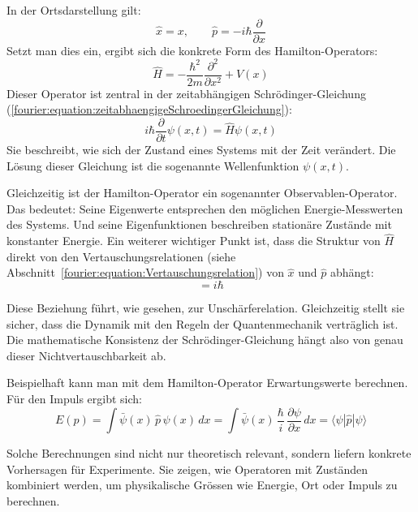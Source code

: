 		In der Ortsdarstellung gilt:
		\begin{equation}
			\hat{x} = x, \qquad \hat{p} = -i\hbar \frac{\partial}{\partial x}
		\end{equation}
		Setzt man dies ein, ergibt sich die konkrete Form des Hamilton-Operators:
		\begin{equation}
			\hat{H} = -\frac{\hbar^2}{2m} \frac{\partial^2}{\partial x^2} + V(x)
		\end{equation}
		Dieser Operator ist zentral in der zeitabhängigen Schrödinger-Gleichung (\ref{fourier:equation:zeitabhaengigeSchroedingerGleichung}):
		\begin{equation}
			i\hbar \frac{\partial}{\partial t} \psi(x,t) = \hat{H} \psi(x,t)
		\end{equation}
		Sie beschreibt, wie sich der Zustand eines Systems mit der Zeit verändert.
		Die Lösung dieser Gleichung ist die sogenannte Wellenfunktion \( \psi(x,t) \).

		Gleichzeitig ist der Hamilton-Operator ein sogenannter Observablen-Operator.
		Das bedeutet:
		Seine Eigenwerte entsprechen den möglichen Energie-Messwerten des Systems.
		Und seine Eigenfunktionen beschreiben stationäre Zustände mit konstanter Energie.
		Ein weiterer wichtiger Punkt ist, dass die Struktur von \( \hat{H} \) direkt von den Vertauschungsrelationen (siehe Abschnitt~\ref{fourier:equation:Vertauschungsrelation}) von \( \hat{x} \) und \( \hat{p} \) abhängt:
		\begin{equation}
			[\hat{x}, \hat{p}] = i \hbar
		\end{equation}

		Diese Beziehung führt, wie gesehen, zur Unschärferelation.
		Gleichzeitig stellt sie sicher, dass die Dynamik mit den Regeln der Quantenmechanik verträglich ist.
		Die mathematische Konsistenz der Schrödinger-Gleichung hängt also von genau dieser Nichtvertauschbarkeit ab.

		Beispielhaft kann man mit dem Hamilton-Operator Erwartungswerte berechnen.
		Für den Impuls ergibt sich:
		\begin{equation}
			E(p) = \int \bar{\psi}(x) \, \hat{p} \, \psi(x) \, dx 
			= \int \bar{\psi}(x) \, \frac{\hbar}{i} \, \frac{\partial \psi}{\partial x} \, dx 
			= \langle \psi | \hat{p} | \psi \rangle
		\end{equation}


		Solche Berechnungen sind nicht nur theoretisch relevant, sondern liefern konkrete Vorhersagen für Experimente.
		Sie zeigen, wie Operatoren mit Zuständen kombiniert werden, um physikalische Grössen wie Energie, Ort oder Impuls zu berechnen.

